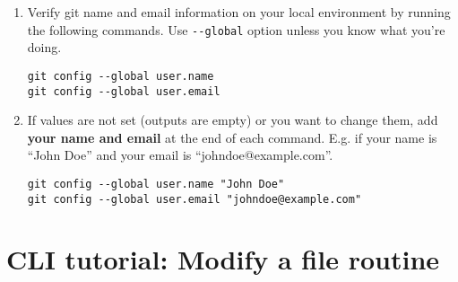 \begin{enumerate}
  \begin{enumerate}
  \def\labelenumii{\arabic{enumii}.}
  \item
    Verify git name and email information on your local environment by running the following commands. Use \texttt{-\/-global} option unless you know what you're doing.
\begin{verbatim}
git config --global user.name
git config --global user.email
\end{verbatim}
  \item
    If values are not set (outputs are empty) or you want to change them, add \textbf{your name and email} at the end of each command. E.g. if your name is ``John Doe'' and your email is ``johndoe@example.com''.
\begin{verbatim}
git config --global user.name "John Doe"
git config --global user.email "johndoe@example.com"
\end{verbatim}
  \end{enumerate}
\end{enumerate}

\section{CLI tutorial: Modify a file routine}\label{cli-tutorial-modify-a-file-routine}

